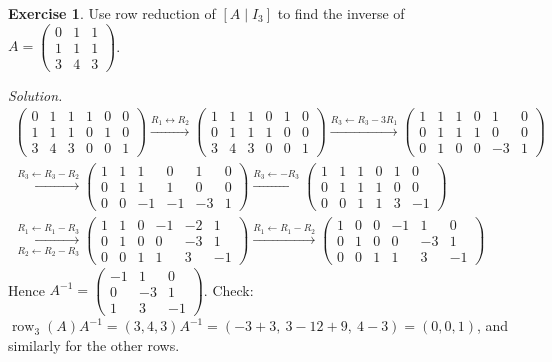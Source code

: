 \documentclass[12pt]{article}
\DeclareMathOperator{\row}{row}
\theoremstyle{definition}
\newtheorem{exercise}{Exercise}
\newenvironment{solution}{\par\noindent\textit{Solution.}\ }{\par\smallskip}
\begin{document}
\begin{exercise}\label{r2-ex-inverse}
Use row reduction of \([A\mid I_3]\) to find the inverse of
\(A=\begin{pmatrix}0&1&1\\1&1&1\\3&4&3\end{pmatrix}\).
\end{exercise}
\begin{solution}
\[
\begin{gathered}
\left(\begin{array}{ccc|ccc}0&1&1&1&0&0\\1&1&1&0&1&0\\3&4&3&0&0&1\end{array}\right)
\xrightarrow{R_1\leftrightarrow R_2}
\left(\begin{array}{ccc|ccc}1&1&1&0&1&0\\0&1&1&1&0&0\\3&4&3&0&0&1\end{array}\right)
\xrightarrow{R_3\leftarrow R_3-3R_1}
\left(\begin{array}{ccc|ccc}1&1&1&0&1&0\\0&1&1&1&0&0\\0&1&0&0&-3&1\end{array}\right)
\\
\xrightarrow{R_3\leftarrow R_3-R_2}
\left(\begin{array}{ccc|ccc}1&1&1&0&1&0\\0&1&1&1&0&0\\0&0&-1&-1&-3&1\end{array}\right)
\xrightarrow{R_3\leftarrow -R_3}
\left(\begin{array}{ccc|ccc}1&1&1&0&1&0\\0&1&1&1&0&0\\0&0&1&1&3&-1\end{array}\right)
\\
\xrightarrow[R_2\leftarrow R_2-R_3]{R_1\leftarrow R_1-R_3}
\left(\begin{array}{ccc|ccc}1&1&0&-1&-2&1\\0&1&0&0&-3&1\\0&0&1&1&3&-1\end{array}\right)
\xrightarrow{R_1\leftarrow R_1-R_2}
\left(\begin{array}{ccc|ccc}1&0&0&-1&1&0\\0&1&0&0&-3&1\\0&0&1&1&3&-1\end{array}\right)
\end{gathered}
\]
Hence
\(A^{-1}=\left(\begin{smallmatrix}-1&1&0\\0&-3&1\\1&3&-1\end{smallmatrix}\right)\). Check:
\(\row_3(A)A^{-1}=(3,4,3)A^{-1}=(-3+3,\ 3-12+9,\ 4-3)=(0,0,1)\), and similarly for the other
rows.
\end{solution}
\end{document}
